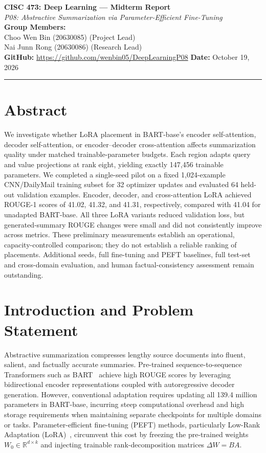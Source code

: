 \documentclass[11pt, letterpaper]{article}
\begin{document}
{\centering
  {\Large\textbf{CISC 473: Deep Learning --- Midterm Report}}\\[0.5em]
  {\large\textit{P08: Abstractive Summarization via Parameter-Efficient Fine-Tuning}}\\[0.4em]
  \textbf{Group Members:}\\
  Choo Wen Bin (20630085) (Project Lead) \quad
  \\Nai Junn Rong (20630086) (Research Lead)\\[0.3em]
  \textbf{GitHub:} \url{https://github.com/wenbin05/DeepLearningP08} \quad \textbf{Date:} October 19, 2026\\[0.4em]
  \rule{\linewidth}{0.4pt}
}

\section{Abstract}
We investigate whether LoRA placement in BART-base's encoder self-attention,
decoder self-attention, or encoder--decoder cross-attention affects summarization
quality under matched trainable-parameter budgets. Each region adapts query and
value projections at rank eight, yielding exactly 147,456 trainable parameters.
We completed a single-seed pilot on a fixed 1,024-example CNN/DailyMail training
subset for 32 optimizer updates and evaluated 64 held-out validation examples.
Encoder, decoder, and cross-attention LoRA achieved ROUGE-1 scores of 41.02,
41.32, and 41.31, respectively, compared with 41.04 for unadapted BART-base.
All three LoRA variants reduced validation loss, but generated-summary ROUGE
changes were small and did not consistently improve across metrics. These
preliminary measurements establish an operational, capacity-controlled comparison;
they do not establish a reliable ranking of placements. Additional seeds,
full fine-tuning and PEFT baselines, full test-set and cross-domain evaluation,
and human factual-consistency assessment remain outstanding.

\section{Introduction and Problem Statement}
Abstractive summarization compresses lengthy source documents into fluent, salient, and factually accurate summaries. Pre-trained sequence-to-sequence Transformers such as BART~\cite{lewis2020bart} achieve high ROUGE scores by leveraging bidirectional encoder representations coupled with autoregressive decoder generation. However, conventional adaptation requires updating all 139.4 million parameters in BART-base, incurring steep computational overhead and high storage requirements when maintaining separate checkpoints for multiple domains or tasks. Parameter-efficient fine-tuning (PEFT) methods, particularly Low-Rank Adaptation (LoRA)~\cite{hu2022lora}, circumvent this cost by freezing the pre-trained weights $W_0 \in \mathbb{R}^{d \times k}$ and injecting trainable rank-decomposition matrices $\Delta W = B A$.
\end{document}
